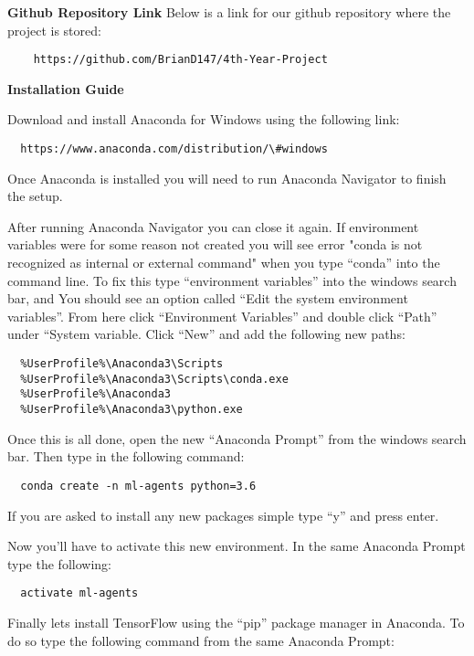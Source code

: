 
\appendix
\begin{flushleft}
\large\textbf{Github Repository Link}
Below is a link for our github repository where the project is stored:

\begin{verbatim}
    https://github.com/BrianD147/4th-Year-Project
\end{verbatim}


\large\textbf{Installation Guide}

Download and install Anaconda for Windows using the following link:

\begin{verbatim}
  https://www.anaconda.com/distribution/\#windows
\end{verbatim}

Once Anaconda is installed you will need to run Anaconda Navigator to finish the setup.

After running Anaconda Navigator you can close it again. If environment variables were for some reason not created you will see error "conda is not recognized as internal or external command" when you type “conda” into the command line. To fix this type “environment variables” into the windows search bar, and You should see an option called “Edit the system environment variables”. From here click “Environment Variables” and double click “Path” under “System variable. Click “New” and add the following new paths:

\begin{verbatim}
  %UserProfile%\Anaconda3\Scripts
  %UserProfile%\Anaconda3\Scripts\conda.exe
  %UserProfile%\Anaconda3
  %UserProfile%\Anaconda3\python.exe
\end{verbatim}

Once this is all done, open the new “Anaconda Prompt” from the windows search bar. Then type in the following command:
\begin{verbatim}
  conda create -n ml-agents python=3.6
\end{verbatim}
If you are asked to install any new packages simple type “y” and press enter.

Now you’ll have to activate this new environment. In the same Anaconda Prompt type the following:
\begin{verbatim}
  activate ml-agents
\end{verbatim}

Finally lets install TensorFlow using the “pip” package manager in Anaconda. To do so type the following command from the same Anaconda Prompt:


\end{flushleft}
